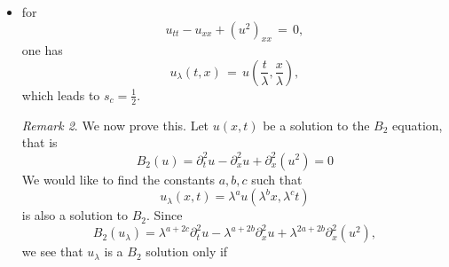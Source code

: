 \documentclass[12pt,reqno]{amsart}
\numberwithin{equation}{section}  %
\numberwithin{figure}{section}
\newcommand{\nin}{\noindent}
\newcommand{\rr}{\mathbb{R}}
\newcommand{\ci}{\mathbb{T}}
\newcommand{\wh}{\widehat}
\theoremstyle{plain}
\theoremstyle{definition}
\theoremstyle{remark}
\newtheorem{remark}{Remark}
\begin{document}
\begin{itemize}
\begin{framed}
\begin{remark}
\begin{equation*}
\begin{split}
\end{split}
\end{equation*}
%
%
Substituting back into \eqref{crit-ind-comp}, we obtain
%
%
\begin{equation*}
\begin{split}
  \| u_{\lambda} \|_{\dot{H}^s(\rr)} 
  & = \lambda^{2} \left( \int_{\rr} | \xi |^{2s} |
  \frac{1}{\lambda}\wh{u(\cdot, \lambda^{2}t)}(\frac{\xi}{\lambda}) |^2 d \xi
  \right)^{1/2}
  \\
  & = \lambda \left( \int_{\rr}| \xi |^{2s} | \wh{u(\cdot,
  \lambda^{2}t)}(\frac{\xi}{\lambda}) |^2 d \xi  \right)^{1/2}
  \\
  & = \lambda \left( \int_{\rr} | \lambda \xi' |^{2s} 
  \wh{u(\cdot, \lambda^{2}t)}(\xi') |^2 \lambda d \xi
  \right)^{1/2}
  \\
  & = \lambda^{s + 3/2} \|u(\cdot, \lambda^{2}t) \|_{\dot{H}^s (\ci)}.
\end{split}
\end{equation*}
%
%
Therefore, $\| u_{\lambda(0)} \|_{\dot{H}^s(\rr)} = \lambda^{s + 3/2} \|
u_{0} \|_{\dot{H}^{s}(\rr)}$, and so $s=-3/2$ is the critical Sobolev index.
\end{remark}
\end{framed}
\nin
Since the scaling conserves data in $\dot{H}^{-3/2}$\ldots
It seems that this equation is ``like KdV''.
So one may expect KdV type theorems\ldots
That is, $s_c=-3/4$ on the line and $s_c=-1/2$ on the circle,
if one uses bilinear estimates.
But, Kappeler and collaborators went all the way to $-1$ for KdV.
However KdV is integrable. Is this equation integrable?
Also, people conjecture that the critical index for KdV well-posedness 
in some appropriate sense should be the scaling index which is  $-3/2$.
  \item for 
    \[
    u_{tt}-u_{xx}+(u^2)_{xx}\,=\,0,
    \]
    one has 
    \[
    u_{\lambda}(t,x)\,=\,u\left(\frac{t}{\lambda}, \frac{x}{\lambda}\right),
    \]
    which leads to $s_c=\frac 12$.
\begin{framed}
\begin{remark}
We now prove this. 
Let $u(x, t)$ be a solution to the $B_2$ equation, that is
%
$$
B_2(u)=
 \partial_t^2u - \partial^2_x u + \partial_x^2(u^2)  = 0
$$
%
We would like to find the constants
$a, b, c$ such that
\[
u_\lambda (x, t) = \lambda^a u(\lambda^b x, \lambda^c t)
\]
is also a solution to $B_2$.  Since 
$$
B_2(u_\lambda)=
\lambda^{a+2c} \partial_t^2u 
-
 \lambda^{a+2b} \partial^2_x u 
 +
  \lambda^{2a+2b}
  \partial_x^2(u^2),  
$$
we see that $u_\lambda$ is a $B_2$ solution only if

\end{remark}
\end{framed}
\end{itemize}
\end{document}

